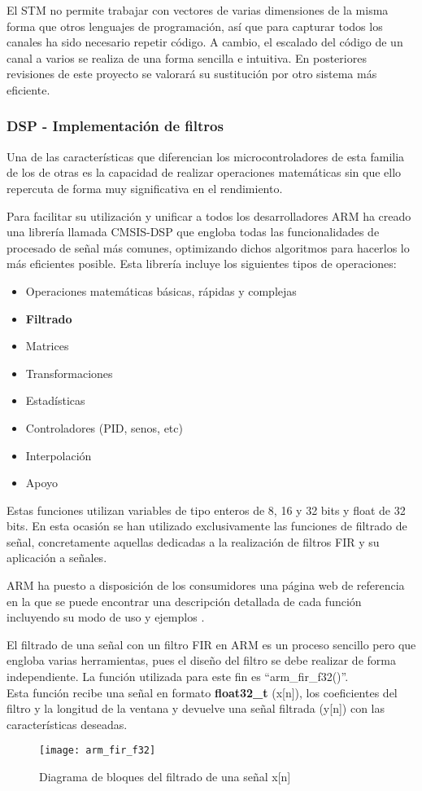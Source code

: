 El STM no permite trabajar con vectores de varias dimensiones de la misma forma que otros lenguajes de programación, así que para capturar todos los canales ha sido necesario repetir código. A cambio, el escalado del código de un canal a varios se realiza de una forma sencilla e intuitiva. En posteriores revisiones de este proyecto se valorará su sustitución por otro sistema más eficiente.

\subsubsection{DSP - Implementación de filtros \label{sec:Software_micro_DSP}}

Una de las características que diferencian los microcontroladores de esta familia de los de otras es la capacidad de realizar operaciones matemáticas sin que ello repercuta de forma muy significativa en el rendimiento. 

Para facilitar su utilización y unificar a todos los desarrolladores ARM ha creado una librería llamada CMSIS-DSP que engloba todas las funcionalidades de procesado de señal más comunes, optimizando dichos algoritmos para hacerlos lo más eficientes posible.
Esta librería incluye los siguientes tipos de operaciones:

\begin{itemize}
\item Operaciones matemáticas básicas, rápidas y complejas
\item \textbf{Filtrado}
\item Matrices
\item Transformaciones
\item Estadísticas
\item Controladores (PID, senos, etc)
\item Interpolación
\item Apoyo
\end{itemize}

Estas funciones utilizan variables de tipo enteros de 8, 16 y 32 bits y float de 32 bits. En esta ocasión se han utilizado exclusivamente las funciones de filtrado de señal, concretamente aquellas dedicadas a la realización de filtros FIR y su aplicación a señales.

ARM ha puesto a disposición de los consumidores una página web de referencia en la que se puede encontrar una descripción detallada de cada función incluyendo su modo de uso y ejemplos \cite{CMSIS-DSP}.

El filtrado de una señal con un filtro FIR en ARM es un proceso sencillo pero que engloba varias herramientas, pues el diseño del filtro se debe realizar de forma independiente. La función utilizada para este fin es ``arm\_fir\_f32()''. \\
Esta función recibe una señal en formato \textbf{float32\_t} (x[n]), los coeficientes del filtro y la longitud de la ventana y devuelve una señal filtrada (y[n]) con las características deseadas.
\begin{figure} [h]
    \centering
    \texttt{[image: arm\_fir\_f32]}
    \caption{Diagrama de bloques del filtrado de una señal x[n]}
    \label{fig:arm_fir_f32}
\end{figure}

